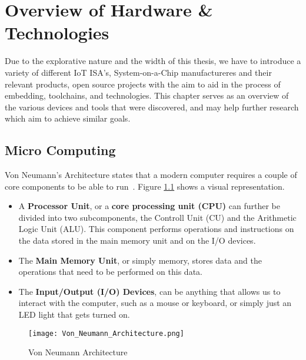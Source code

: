\chapter{Overview of Hardware \& Technologies}

Due to the explorative nature and the width of this thesis, we have to introduce a variety of different IoT ISA's, System-on-a-Chip manufactureres and their relevant products, open source projects with the aim to aid in the process of embedding, toolchains, and technologies. This chapter serves as an overview of the various devices and tools that were discovered, and may help further research which aim to achieve similar goals.

\section{Micro Computing}
Von Neumann's Architecture states that a modern computer requires a couple of core components to be able to run~\cite{arikpo2007neumann}. Figure \ref{fig:vonNeumanng} shows a visual representation.
\begin{itemize}
\item A \textbf{Processor Unit}, or a \textbf{core processing unit (CPU)} can further be divided into two subcomponents, the Controll Unit (CU) and the Arithmetic Logic Unit (ALU). This component performs operations and instructions on the data stored in the main memory unit and on the I/O devices.
\item The \textbf{Main Memory Unit}, or simply memory, stores data and the operations that need to be performed on this data.
\item The \textbf{Input/Output (I/O) Devices}, can be anything that allows us to interact with the computer, such as a mouse or keyboard, or simply just an LED light that gets turned on.
\end{itemize}

\begin{figure}
\centering
\texttt{[image: Von\_Neumann\_Architecture.png]}
\caption{Von Neumann Architecture~\cite{vonNeumanngfx}}
\label{fig:vonNeumanng}
\end{figure}

